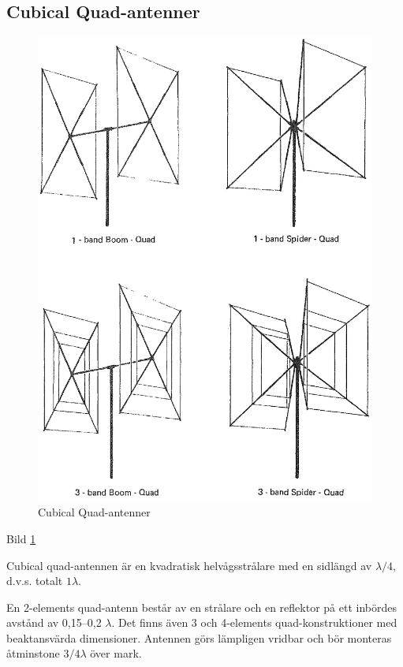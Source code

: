 \subsection{Cubical Quad-antenner}

\begin{figure}
  \includegraphics[width=\textwidth]{images/bild_2_6-19.png}
  \caption{Cubical Quad-antenner}
  \label{fig:bildII6-19}
\end{figure}

Bild \ref{fig:bildII6-19}

Cubical quad-antennen är en kvadratisk helvågsstrålare med en sidlängd
av \(\lambda/4\), d.v.s. totalt \(1\lambda\).

En 2-elements quad-antenn består av en strålare och en reflektor på
ett inbördes avstånd av 0,15--0,2 \(\lambda\). Det finns även 3 och
4-elements quad-konstruktioner med beaktansvärda dimensioner. Antennen
görs lämpligen vridbar och bör monteras åtminstone \(3/4 \lambda\)
över mark.

